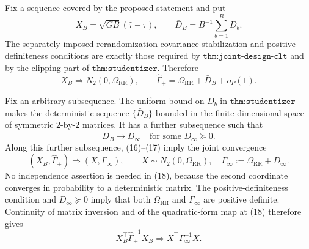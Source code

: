 Fix a sequence covered by the proposed statement and put
\[
 X_B=\sqrt{GB}(\widehat\tau-\tau),
 \qquad
 \bar D_B=B^{-1}\sum_{b=1}^BD_b.
\]
The separately imposed rerandomization covariance stabilization and positive-definiteness conditions are exactly those required by \(\texttt{thm:joint-design-clt}\) and by the clipping part of \(\texttt{thm:studentizer}\).  Therefore
\[
 X_B\Rightarrow N_2(0,\Omega_{\mathrm{RR}}),
 \qquad
 \widehat\Gamma_+
 =\Omega_{\mathrm{RR}}+\bar D_B+o_P(1).                    \tag{16}
\]

Fix an arbitrary subsequence.  The uniform bound on \(D_b\) in \(\texttt{thm:studentizer}\) makes the deterministic sequence \(\{\bar D_B\}\) bounded in the finite-dimensional space of symmetric \(2\)-by-\(2\) matrices.  It has a further subsequence such that
\[
 \bar D_B\longrightarrow D_\infty
 \quad\text{for some }D_\infty\succeq0.                  \tag{17}
\]
Along this further subsequence, (16)--(17) imply the joint convergence
\[
 (X_B,\widehat\Gamma_+)\Rightarrow(X,\Gamma_\infty),
 \qquad
 X\sim N_2(0,\Omega_{\mathrm{RR}}),
 \quad
 \Gamma_\infty:=\Omega_{\mathrm{RR}}+D_\infty.           \tag{18}
\]
No independence assertion is needed in (18), because the second coordinate converges in probability to a deterministic matrix.  The positive-definiteness condition and \(D_\infty\succeq0\) imply that both \(\Omega_{\mathrm{RR}}\) and \(\Gamma_\infty\) are positive definite.  Continuity of matrix inversion and of the quadratic-form map at (18) therefore gives
\[
 X_B^\top\widehat\Gamma_+^{-1}X_B
 \Rightarrow X^\top\Gamma_\infty^{-1}X.                  \tag{19}
\]

